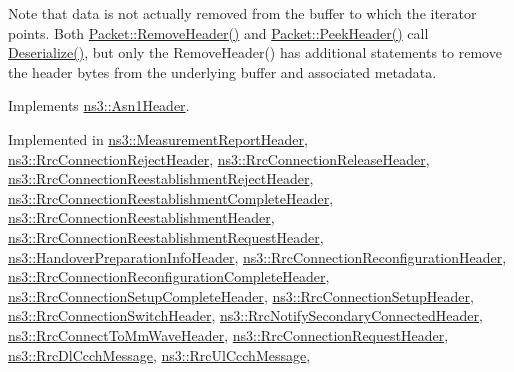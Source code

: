 Note that data is not actually removed from the buffer to which the iterator points. Both \hyperlink{classns3_1_1Packet_a0961eccf975d75f902d40956c93ba63e}{Packet\+::\+Remove\+Header()} and \hyperlink{classns3_1_1Packet_aadc63487bea70945c418f4c3e9b81964}{Packet\+::\+Peek\+Header()} call \hyperlink{classns3_1_1RrcAsn1Header_afbb8ee5709d02eca06349cd26052108a}{Deserialize()}, but only the Remove\+Header() has additional statements to remove the header bytes from the underlying buffer and associated metadata. 

Implements \hyperlink{classns3_1_1Asn1Header_a4664472c9288585a19f4f92202f490c0}{ns3\+::\+Asn1\+Header}.



Implemented in \hyperlink{classns3_1_1MeasurementReportHeader_a432b1c3563184d6f9fc0a7e3c75c9eaf}{ns3\+::\+Measurement\+Report\+Header}, \hyperlink{classns3_1_1RrcConnectionRejectHeader_aee0fe0a7c91b98ddd6dbd4d9a21aa222}{ns3\+::\+Rrc\+Connection\+Reject\+Header}, \hyperlink{classns3_1_1RrcConnectionReleaseHeader_ae3b88034e9a622c2c5b4104d9382325b}{ns3\+::\+Rrc\+Connection\+Release\+Header}, \hyperlink{classns3_1_1RrcConnectionReestablishmentRejectHeader_a660011621e8fcb43c5ea845469a9dedb}{ns3\+::\+Rrc\+Connection\+Reestablishment\+Reject\+Header}, \hyperlink{classns3_1_1RrcConnectionReestablishmentCompleteHeader_a21ddb8fee9216464e213aee5b3f91dac}{ns3\+::\+Rrc\+Connection\+Reestablishment\+Complete\+Header}, \hyperlink{classns3_1_1RrcConnectionReestablishmentHeader_abb843777db19cfbf033e8ffcbc539e5d}{ns3\+::\+Rrc\+Connection\+Reestablishment\+Header}, \hyperlink{classns3_1_1RrcConnectionReestablishmentRequestHeader_a912a20fb879046a7c61a8f5124e6b809}{ns3\+::\+Rrc\+Connection\+Reestablishment\+Request\+Header}, \hyperlink{classns3_1_1HandoverPreparationInfoHeader_aee844b98e550f07ccf59193acd0a5f43}{ns3\+::\+Handover\+Preparation\+Info\+Header}, \hyperlink{classns3_1_1RrcConnectionReconfigurationHeader_a3de5336b7cbf44d26b57dd17183361be}{ns3\+::\+Rrc\+Connection\+Reconfiguration\+Header}, \hyperlink{classns3_1_1RrcConnectionReconfigurationCompleteHeader_a35f73b45bd52514418568eb28bdb13a6}{ns3\+::\+Rrc\+Connection\+Reconfiguration\+Complete\+Header}, \hyperlink{classns3_1_1RrcConnectionSetupCompleteHeader_a6af94bc42c6b6de53b39cb78ddd459a8}{ns3\+::\+Rrc\+Connection\+Setup\+Complete\+Header}, \hyperlink{classns3_1_1RrcConnectionSetupHeader_aa1f32f316948db4cbcca696b25973798}{ns3\+::\+Rrc\+Connection\+Setup\+Header}, \hyperlink{classns3_1_1RrcConnectionSwitchHeader_a9b27f43e1e87cbeb554ceb0ef818210e}{ns3\+::\+Rrc\+Connection\+Switch\+Header}, \hyperlink{classns3_1_1RrcNotifySecondaryConnectedHeader_ae943b583ad31a87771f9b3e2f9309c80}{ns3\+::\+Rrc\+Notify\+Secondary\+Connected\+Header}, \hyperlink{classns3_1_1RrcConnectToMmWaveHeader_a5d6bf13a33fb54a0d8c6338c1748b191}{ns3\+::\+Rrc\+Connect\+To\+Mm\+Wave\+Header}, \hyperlink{classns3_1_1RrcConnectionRequestHeader_a6362799c63372977477e5a98013c8877}{ns3\+::\+Rrc\+Connection\+Request\+Header}, \hyperlink{classns3_1_1RrcDlCcchMessage_a302e719efa5b9e43c0a4acd097c65b57}{ns3\+::\+Rrc\+Dl\+Ccch\+Message}, \hyperlink{classns3_1_1RrcUlCcchMessage_a61b96b11357e6e34d48a3ec1b7d31a38}{ns3\+::\+Rrc\+Ul\+Ccch\+Message}, 